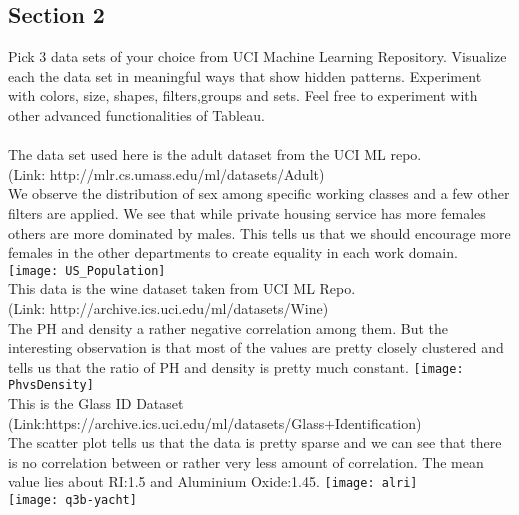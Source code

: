 \documentclass[12pt,a4paper,titlepage]{article}
\begin{document}
{{{\subsection{Section 2}{Pick 3 data sets of your choice from UCI Machine Learning Repository. Visualize each the data set in meaningful ways that show hidden patterns. Experiment with colors, size, shapes, filters,groups and sets. Feel free to experiment with other advanced functionalities of Tableau.\\~\\
\centering
The data set used here is the adult dataset from the UCI ML repo.\\
(Link: http://mlr.cs.umass.edu/ml/datasets/Adult)\\
We observe the distribution of sex among specific working classes and a few other filters are applied. We see that while private housing service has more females others are more dominated by males. This tells us that we should encourage more females in the other departments to create equality in each work domain.\\
\texttt{[image: US\_Population]}\\
This data is the wine dataset taken from UCI ML Repo.\\
(Link: http://archive.ics.uci.edu/ml/datasets/Wine)\\
The PH and density a rather negative correlation among them. But the interesting observation is that most of the values are pretty closely clustered and tells us that the ratio of PH and density is pretty much constant.
\texttt{[image: PhvsDensity]}\\
This is the Glass ID Dataset\\
(Link:https://archive.ics.uci.edu/ml/datasets/Glass+Identification)\\
The scatter plot tells us that the data is pretty sparse and we can see that there is no correlation between or rather very less amount of correlation. The mean value lies about RI:1.5 and Aluminium Oxide:1.45.
\texttt{[image: alri]}\\
\texttt{[image: q3b-yacht]}\\
}

}}}
\end{document}
